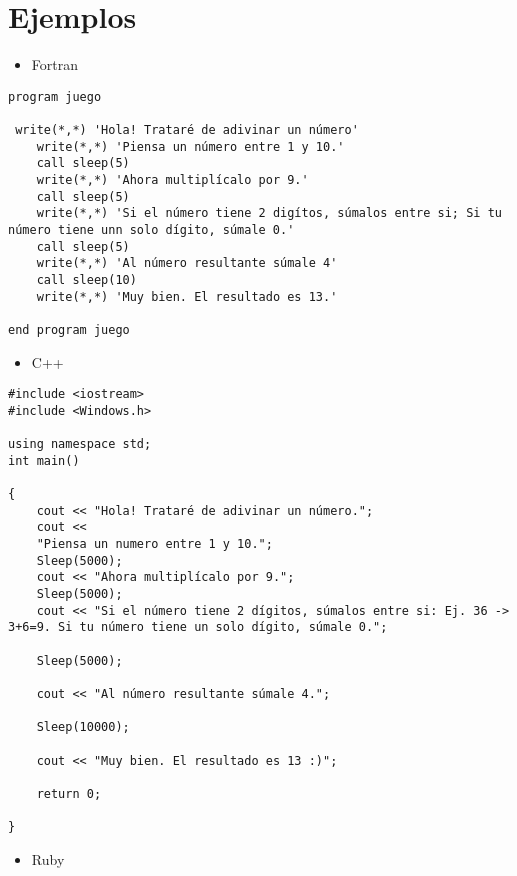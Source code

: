 \documentclass{article}
\begin{document}
\section{Ejemplos}

\begin{itemize}
\item Fortran
\end{itemize}
\begin{verbatim}
program juego
   
 write(*,*) 'Hola! Trataré de adivinar un número'
    write(*,*) 'Piensa un número entre 1 y 10.'
    call sleep(5)
    write(*,*) 'Ahora multiplícalo por 9.'
    call sleep(5)
    write(*,*) 'Si el número tiene 2 digítos, súmalos entre si; Si tu número tiene unn solo dígito, súmale 0.'
    call sleep(5)
    write(*,*) 'Al número resultante súmale 4'
    call sleep(10)
    write(*,*) 'Muy bien. El resultado es 13.' 

end program juego

\end{verbatim}

\begin{itemize}
\item C++
\end{itemize}

\begin{verbatim}
#include <iostream>
#include <Windows.h>

using namespace std;
int main()

{   
	cout << "Hola! Trataré de adivinar un número.";
	cout <<
	"Piensa un numero entre 1 y 10.";
	Sleep(5000);
	cout << "Ahora multiplícalo por 9.";
	Sleep(5000);
	cout << "Si el número tiene 2 dígitos, súmalos entre si: Ej. 36 -> 3+6=9. Si tu número tiene un solo dígito, súmale 0.";

	Sleep(5000);

	cout << "Al número resultante súmale 4.";

	Sleep(10000);

	cout << "Muy bien. El resultado es 13 :)";

	return 0;

}

\end{verbatim}

\begin{itemize}
\item Ruby
\end{itemize}
\end{document}
